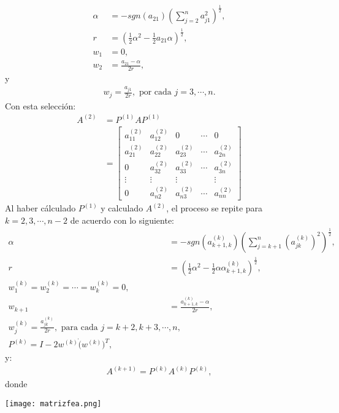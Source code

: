 \begin{align*}
  \alpha&=-sgn(a_{21})\left( \sum_{j=2}^{n}a_{j1}^2 \right)^{\frac{1}{2}},\\
  r&=\left( \frac{1}{2}\alpha^2-\frac{1}{2}a_{21}\alpha \right)^{\frac{1}{2}},\\
  w_1&=0,\\
  w_2&=\frac{a_{21}-\alpha}{2r},
\end{align*}
y
\begin{align*}
  w_{j}=\frac{a_{j1}}{2r},\text{ por cada }j=3,\cdots,n.
\end{align*}
Con esta selección:
\begin{align*}
  A^{(2)}&=P^{(1)}AP^{(1)}\\
  &=\begin{bmatrix}
    a_{11}^{(2)}& a_{12}^{(2)}& 0 & \cdots & 0 \\
    a_{21}^{(2)} & a_{22}^{(2)} & a_{23}^{(2)} & \cdots & a_{2n}^{(2)} \\
    0 & a_{32}^{(2)} & a_{33}^{(2)} & \cdots & a_{3n}^{(2)} \\
    \vdots & \vdots & \vdots &  & \vdots \\
    0 & a_{n2}^{(2)} & a_{n3}^{(2)} & \cdots & a_{nn}^{(2)}
  \end{bmatrix} 
\end{align*}
Al haber cálculado $P^{(1)}$ y calculado $A^{(2)}$, el proceso se repite para $k=2,3,\cdots,n-2$ de acuerdo con lo siguiente:
\begin{align*}
  \alpha&=-sgn(a_{k+1,k}^{(k)})\left( \sum_{j=k+1}^{n}(a_{jk}^{(k)})^{2} \right)^{\frac{1}{2}},\\
  r&=\left( \frac{1}{2}\alpha^2-\frac{1}{2}\alpha\alpha_{k+1,k}^{(k)} \right)^{\frac{1}{2}},\\
  w_1^{(k)}=w_{2}^{(k)}=\cdots=w_{k}^{(k)}=0,\\
  w_{k+1}&=\frac{a_{k+1,k}^{(k)}-\alpha}{2r},\\
  w_{j}^{(k)}=\frac{a_{jk}^{(k)}}{2r},\text{ para cada }j=k+2,k+3,\cdots,n,\\
  P^{(k)}=I-2w^{(k)}\dot(w^{(k)})^T,
\end{align*}
y:
\begin{align*}
  A^{(k+1)}=P^{(k)}A^{(k)}P^{(k)},
\end{align*}
donde
\begin{center}
  \texttt{[image: matrizfea.png]}
\end{center}
















